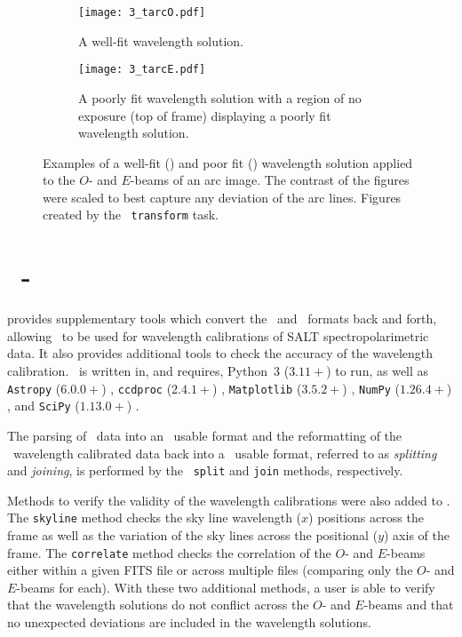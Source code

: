 \begin{figure}
    \centering
    \begin{subfigure}[b]{1.0 \textwidth}
        \centering
        \texttt{[image: 3\_tarcO.pdf]}
        \caption{A well-fit wavelength solution.}
        \label{fig:trans_O}
    \end{subfigure}
    \centering
    \begin{subfigure}[b]{1.0\textwidth}
        \centering
        \texttt{[image: 3\_tarcE.pdf]}
        \caption{A poorly fit wavelength solution with a region of no exposure (top of frame) displaying a poorly fit wavelength solution.}
        \label{fig:trans_E}
    \end{subfigure}
    \caption{Examples of a well-fit () and poor fit () wavelength solution applied to the $O$- and $E$-beams  of an arc image. The contrast of the figures were scaled to best capture any deviation of the arc lines. Figures created by the \iraf\ \texttt{transform} task.}
    \label{fig:iraf_trans_plot}
\end{figure}

\section[\textsc{stops}]{\stops\ - } \label{sec:stops}

 provides supplementary tools which convert the \polsalt\ and \iraf\ formats back and forth, allowing \iraf\ to be used for wavelength calibrations of \gls{SALT} spectropolarimetric data. It also provides additional tools to check the accuracy of the wavelength calibration.
\stops\ is written in, and requires, Python~$3$ ($3.11+$) to run, as well as \texttt{Astropy} ($6.0.0+$) \citep{astropy:2013, astropy:2018, astropy:2022}, \texttt{ccdproc} ($2.4.1+$) \citep{ccdproc}, \texttt{Matplotlib} ($3.5.2+$) \citep{matplotlib}, \texttt{NumPy} ($1.26.4+$) \citep{numpy}, and \texttt{SciPy} ($1.13.0+$) \citep{scipy}.

The parsing of \polsalt\ data into an \iraf\ usable format and the reformatting of the \iraf\ wavelength calibrated data back into a \polsalt\ usable format, referred to as \textit{splitting} and \textit{joining}, is performed by the \stops\ \texttt{split} and \texttt{join} methods, respectively.

Methods to verify the validity of the wavelength calibrations were also added to \stops. The \texttt{skyline} method checks the sky line wavelength ($x$) positions across the frame as well as the variation of the sky lines across the positional ($y$) axis of the frame. The \texttt{correlate} method checks the correlation of the $O$- and $E$-beams either within a given \gls{FITS} file or across multiple files (comparing only the $O$- and $E$-beams for each). With these two additional methods, a user is able to verify that the wavelength solutions do not conflict across the $O$- and $E$-beams and that no unexpected deviations are included in the wavelength solutions.

